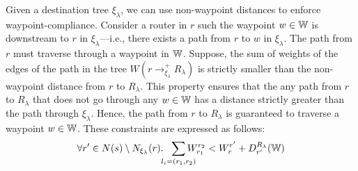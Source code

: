 
Given a destination tree $\xi_\lambda$, we can use
non-waypoint distances to enforce waypoint-compliance. Consider a 
router in $r$ such the waypoint $w \in \mathbb{W}$ is downstream to $r$ in $\xi_\lambda$---i.e.,
there exists a path from $r$ to $w$ in $\xi_\lambda$.
The path from $r$ must traverse through 
a waypoint in $\mathbb{W}$.  
Suppose, the sum of weights of the edges of
the path in the tree $W(r \rightarrow^+_{\xi_\lambda} R_\lambda)$  
is strictly smaller than the non-waypoint 
distance from $r$ to $R_\lambda$. This property ensures that 
the any path from $r$ to $R_\lambda$ that does not go through
any $w \in \mathbb{W}$ has a distance strictly greater than the path through
$\xi_\lambda$.
Hence, the path from $r$ to $R_\lambda$ is guaranteed to traverse
a waypoint $w \in \mathbb{W}$. These constraints are expressed as follows:
\begin{equation} \label{eq:waypoint}
\forall r' \in N(s) \setminus N_{\xi_\lambda}(r).~~ \sum_{\mathclap{\substack{l_i=(r_1,r_2)}}} 
W_{r_1}^{r_2} < 
W_{r}^{r'}+ D_{r'}^{R_\lambda}(\waypt) 
\end{equation}
